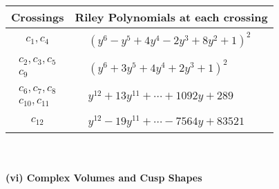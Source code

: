 \documentclass[1p]{elsarticle_modified}
\theoremstyle{definition}
\begin{document}
\begin{tabular}{m{50pt}|m{274pt}}
Crossings & \hspace{64pt}Riley Polynomials at each crossing \\
\hline $$\begin{aligned}c_{1},c_{4}\end{aligned}$$&$\begin{aligned}
&(y^6- y^5+4 y^4-2 y^3+8 y^2+1)^2
\end{aligned}$\\
\hline $$\begin{aligned}c_{2},c_{3},c_{5}\\c_{9}\end{aligned}$$&$\begin{aligned}
&(y^6+3 y^5+4 y^4+2 y^3+1)^2
\end{aligned}$\\
\hline $$\begin{aligned}c_{6},c_{7},c_{8}\\c_{10},c_{11}\end{aligned}$$&$\begin{aligned}
&y^{12}+13 y^{11}+\cdots+1092 y+289
\end{aligned}$\\
\hline $$\begin{aligned}c_{12}\end{aligned}$$&$\begin{aligned}
&y^{12}-19 y^{11}+\cdots-7564 y+83521
\end{aligned}$\\
\hline
\end{tabular}\\~\\
\newpage\flushleft \textbf{(vi) Complex Volumes and Cusp Shapes}
\end{document}
